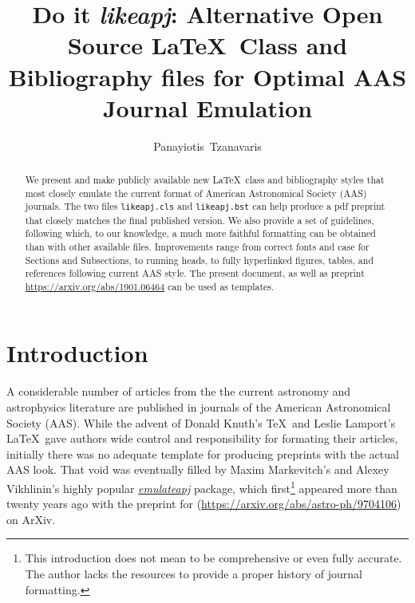 \documentclass[tighten,twocolumn,useAMS,appendixfloats,apj]{likeapj}
\newcommand{\likeapj}{\textit{likeapj}}
\begin{document}
\title{Do it \likeapj: Alternative Open Source \LaTeX\ Class and Bibliography files for Optimal AAS Journal Emulation}
\author{Panayiotis~Tzanavaris}

\begin{abstract}
  We present and make publicly available new \LaTeX\ class and bibliography styles that most closely emulate the current format of American Astronomical Society (AAS) journals. The two files {\tt likeapj.cls} and {\tt likeapj.bst} can help produce a pdf preprint that closely matches the final published version. We also provide a set of guidelines, following which, to our knowledge, a much more faithful formatting can be obtained than with other available files. Improvements range from correct fonts and case for Sections and Subsections, to running heads, to fully hyperlinked figures, tables, and references following current AAS style. The present document, as well as preprint \href{https://arxiv.org/abs/1901.06464}{https://arxiv.org/abs/1901.06464} can be used as templates.
\end{abstract}


\section{Introduction}
A considerable number of articles from the the current astronomy and astrophysics literature are published in journals of the American Astronomical Society (AAS). While the advent of Donald Knuth's \TeX\ and Leslie Lamport's \LaTeX\ gave authors wide control and responsibility for formating their articles, initially there was no adequate template for producing preprints with the actual AAS look. That void was eventually filled by Maxim Markevitch's and Alexey Vikhlinin's highly popular \href{https://hea-www.harvard.edu/~alexey/emulateapj/}{\textit{emulateapj}} package, which first\footnote{This introduction does not mean to be comprehensive or even fully accurate. The author lacks the resources to provide a proper history of journal formatting.} appeared more than twenty years ago with the preprint for \citet{markevitch1997} (\href{https://arxiv.org/abs/astro-ph/9704106}{https://arxiv.org/abs/astro-ph/9704106}) on ArXiv.
\end{document}
